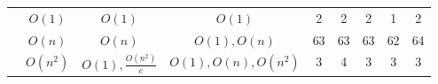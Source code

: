 \begin{table}[ht]
{\begin{tabular}{ >{\scriptsize}c | >{\scriptsize}c | >{\scriptsize}c | >{\scriptsize}c | c | c | c | c | c  }
    \hline \hline
    \multirow{3}{*}{Tianhan} 
    & $O(1)$            & $O(1)$ & $O(1)$  & 2  & 2 & 2 & 1 & 2 \\
    \cline{2-9}
    & $O(n)$            &  $ O(n) $ & $O(1), O(n)$  & 63 & 63 & 63 & 62 & 64 \\
    \cline{2-9}
    & $O(n^2)$          &  $O(1), \frac{O(n^2)}{c}$ & $O(1), O(n), O(n^2)$ & 3 & 4 & 3 & 3 & 3\\
    \hline
    \end{tabular}
    }
\end{table}


    
    